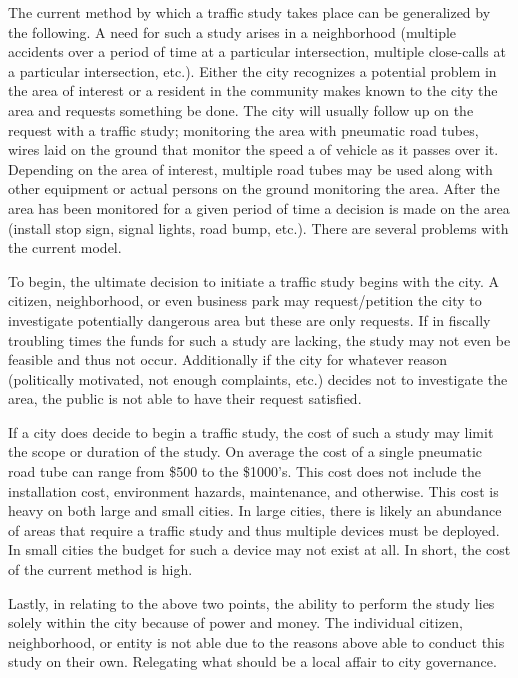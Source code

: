 The current method by which a traffic study takes place can be generalized by the following. A need for such a study arises in a neighborhood (multiple accidents over a period of time at a particular intersection, multiple close-calls at a particular intersection, etc.). Either the city recognizes a potential problem in the area of interest or a resident in the community makes known to the city the area and requests something be done. The city will usually follow up on the request with a traffic study; monitoring the area with pneumatic road tubes, wires laid on the ground that monitor the speed a of vehicle as it passes over it. Depending on the area of interest, multiple road tubes may be used along with other equipment or actual persons on the ground monitoring the area. After the area has been monitored for a given period of time a decision is made on the area (install stop sign, signal lights, road bump, etc.). There are several problems with the current model.

To begin, the ultimate decision to initiate a traffic study begins with the city. A citizen, neighborhood, or even business park may request/petition the city to investigate potentially dangerous area but these are only requests. If in fiscally troubling times the funds for such a study are lacking, the study may not even be feasible and thus not occur. Additionally if the city for whatever reason (politically motivated, not enough complaints, etc.) decides not to investigate the area, the public is not able to have their request satisfied. 

If a city does decide to begin a traffic study, the cost of such a study may limit the scope or duration of the study. On average the cost of a single pneumatic road tube can range from \$500 to the \$1000's. This cost does not include the installation cost, environment hazards, maintenance, and otherwise. This cost is heavy on both large and small cities. In large cities, there is likely an abundance of areas that require a traffic study and thus multiple devices must be deployed. In small cities the budget for such a device may not exist at all. In short, the cost of the current method is high.

Lastly, in relating to the above two points, the ability to perform the study lies solely within the city because of power and money. The individual citizen, neighborhood, or entity is not able due to the reasons above able to conduct this study on their own. Relegating what should be a local affair to city governance. 